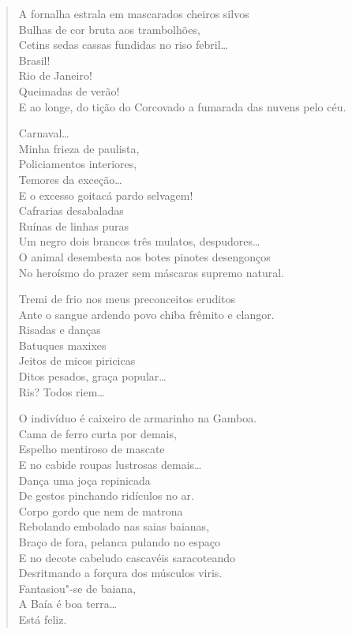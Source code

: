 \begin{verse}
A fornalha estrala em mascarados cheiros silvos\\
Bulhas de cor bruta aos trambolhões,\\
Cetins sedas cassas fundidas no riso febril\ldots{}\\
Brasil!\\
Rio de Janeiro!\\
Queimadas de verão!\\
E ao longe, do tição do Corcovado a fumarada das nuvens pelo céu.

Carnaval\ldots{}\\
Minha frieza de paulista,\\
Policiamentos interiores,\\
Temores da exceção\ldots{}\\
E o excesso goitacá pardo selvagem!\\
Cafrarias desabaladas\\
Ruínas de linhas puras\\
Um negro dois brancos três mulatos, despudores\ldots{}\\
O animal desembesta aos botes pinotes desengonços\\
No heroísmo do prazer sem máscaras supremo natural.

Tremi de frio nos meus preconceitos eruditos\\
Ante o sangue ardendo povo chiba frêmito e clangor.\\
Risadas e danças\\
Batuques maxixes\\
Jeitos de micos piricicas\\
Ditos pesados, graça popular\ldots{}\\
Ris? Todos riem\ldots{}

O indivíduo é caixeiro de armarinho na Gamboa.\\
Cama de ferro curta por demais,\\
Espelho mentiroso de mascate\\
E no cabide roupas lustrosas demais\ldots{}\\
Dança uma joça repinicada\\
De gestos pinchando ridículos no ar.\\
Corpo gordo que nem de matrona\\
Rebolando embolado nas saias baianas,\\
Braço de fora, pelanca pulando no espaço\\
E no decote cabeludo cascavéis saracoteando\\
Desritmando a forçura dos músculos viris.\\
Fantasiou"-se de baiana,\\
\qquad\qquad\qquad\qquad\quad A Baía é boa terra\ldots{}\\
\qquad\qquad\qquad\qquad\qquad\qquad\qquad\qquad\quad Está feliz.


\end{verse}
